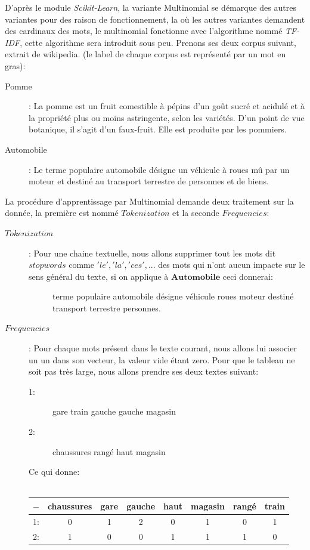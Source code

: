 D'après le module \textit{Scikit-Learn}, la variante Multinomial se démarque des autres variantes pour des raison de fonctionnement, la où les autres variantes demandent des cardinaux des mots, le multinomial fonctionne avec l'algorithme nommé \textit{TF-IDF}, cette algorithme sera introduit sous peu.\linebreak
\linebreak
Prenons ses deux corpus suivant, extrait de wikipedia. (le label de chaque corpus est représenté par un mot en gras):\\
\begin{description}
\item[Pomme]: La pomme est un fruit comestible à pépins d'un goût sucré et acidulé et à la propriété plus ou moins astringente, selon les variétés. D'un point de vue botanique, il s'agit d'un faux-fruit. Elle est produite par les pommiers.
\item[Automobile]: Le terme populaire automobile désigne un véhicule à roues mû par un moteur et destiné au transport terrestre de personnes et de biens.
\end{description}

\pagebreak

La procédure d'apprentissage par Multinomial demande deux traitement sur la donnée, la première est nommé $Tokenization$ et la seconde $Frequencies$:\\
\begin{description}
\item[$Tokenization$]: Pour une chaine textuelle, nous allons supprimer tout les mots dit $stopwords$ comme $'le','la','ces',...$ des mots qui n'ont aucun impacte sur le sens général du texte, si on applique à $\textbf{Automobile}$ ceci donnerai: 
\begin{description}
\item[] terme populaire automobile désigne véhicule roues moteur destiné transport terrestre personnes.
\end{description}

\item[$Frequencies$]: Pour chaque mots présent dans le texte courant, nous allons lui associer un un dans son vecteur, la valeur vide étant zero. Pour que le tableau ne soit pas très large, nous allons prendre ses deux textes suivant: 
\begin{description}
\item[1:] gare train gauche gauche magasin
\item[2:] chaussures rangé haut magasin
\end{description}
Ce qui donne:\\\\
\begin{tabular}{c|c|c|c|c|c|c|c}
$-$ & chaussures & gare & gauche & haut & magasin & rangé & train\\
\hline
1: & 0 & 1 & 2 & 0 & 1 & 0 & 1\\
2: & 1 & 0 & 0 & 1 & 1 & 1 & 0\\
\end{tabular}
\end{description}

